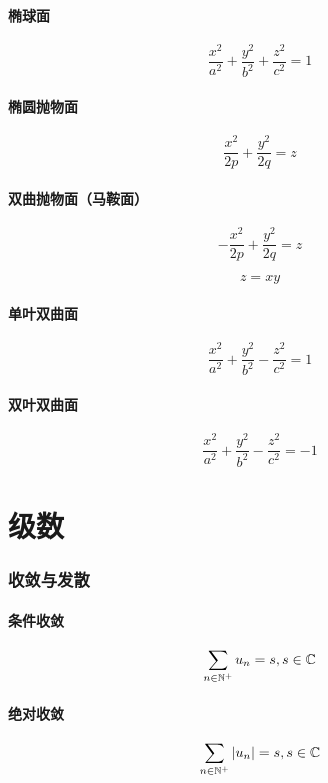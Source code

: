 \documentclass{article}
\begin{document}
\subsection{椭球面}

\[\frac{x^2}{a^2}+\frac{y^2}{b^2}+\frac{z^2}{c^2}=1\]

\subsection{椭圆抛物面}

\[\frac{x^2}{2p}+\frac{y^2}{2q}=z\]

\subsection{双曲抛物面（马鞍面）}

\[-\frac{x^2}{2p}+\frac{y^2}{2q}=z\]

\[z=xy\]

\subsection{单叶双曲面}

\[\frac{x^2}{a^2}+\frac{y^2}{b^2}-\frac{z^2}{c^2}=1\]

\subsection{双叶双曲面}

\[\frac{x^2}{a^2}+\frac{y^2}{b^2}-\frac{z^2}{c^2}=-1\]

\part{级数}

\section{收敛与发散}

\subsection{条件收敛}

\[\sum_{n\in\mathbb N^+}u_n=s,s\in\mathbb C\]

\subsection{绝对收敛}

\[\sum_{n\in\mathbb N^+}\left|u_n\right|=s,s\in\mathbb C\]
\end{document}
